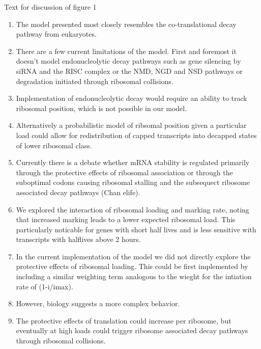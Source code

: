 \documentclass[review]{elsarticle}
\begin{document}
Text for discussion of figure 1
\begin{enumerate}
	\item The model presented most closely resembles the co-translational decay pathway from eukaryotes.
	\item There are a few current limitations of the model. First and foremost it doesn't model endonucleolytic decay pathways such as gene silencing by siRNA and the RISC complex or the NMD, NGD and NSD pathways or degradation initiated through ribosomal collisions.
	\item Implementation of endonucleolytic decay would require an ability to track ribosomal position, which is not possible in our model. 
	\item Alternatively a probabilistic model of ribsomal position given a particular load could allow for redistribution of capped transcripts into decapped states of lower ribosomal class.
	
	\item Currently there is a debate whether mRNA stability is regulated primarily through the protective effects of ribosomal association or through the suboptimal codons causing ribosomal stalling and the subsequect ribosome associated decay pathways  (Chan elife).
	\item We explored the interaction of ribosomal loading and marking rate, noting that increased marking leads to a lower expected ribosomal load. This particularly noticable for genes with short half lives and is less sensitive with transcripts with halflives above 2 hours.
	\item In the current implementation of the model we did not directly explore the protective effects of ribosomal loading. This could be first implemented by including a similar weighting term analogous to the wieght for the intiation rate of (1-i/imax).
	\item However, biology suggests a more complex behavior.
	\item The protective effects of translation could increase per ribosome, but eventually at high loads  could trigger ribosome associated decay pathways through ribosomal collisions.


\end{enumerate}
\end{document}
